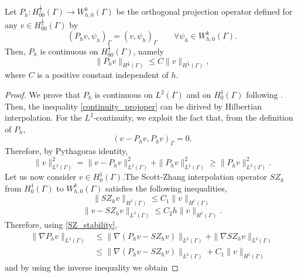 \begin{lemma}
Let $P_h: H^{\frac 12}_{00}(\Gamma) \longrightarrow W_{h,0}^k(\Gamma)$ be the orthogonal projection operator defined  for any $v \in H^{\frac 12}_{00}(\Gamma)$ by
\begin{equation*}
(P_h v , \psi_h)_\Gamma= (v, \psi_h)_\Gamma \qquad \forall \psi_h \in W_{h,0}^k(\Gamma).  
\end{equation*} 
Then, $P_h$ is continuous on $H^{\frac 12}_{00}(\Gamma)$, namely
\begin{equation}\label{continuity_projoper}
\|P_h v\|_{H^{\frac 12}(\Gamma)} \leq C \|v\|_{H^{\frac 12}(\Gamma)},
\end{equation}
where $C$ is a positive constant independent of $h$.
\end{lemma}
\begin{proof}
We prove that $P_h$ is continuous on $L^2(\Gamma)$ and on $H^1_0(\Gamma)$ following \cite[Section 1.6.3]{MR2050138}.  Then, the inequality \eqref{continuity_projoper} can be dirived by Hilbertian interpolation. For the $L^2$-continuity, we exploit the fact that, from the definition of $P_h$,
\begin{equation*}
(v-P_h v,P_h v)_{\Gamma}=0.
\end{equation*} 
Therefore, by Pythagoras identity,
\begin{equation*}
\|v\|^2_{L^2(\Gamma)} = \|v-P_h v\|_{L^2(\Gamma)}^2 + \|P_h v\|_{L^2(\Gamma)}^2 \geq \|P_h v\|^2 _{L^2(\Gamma)}.
\end{equation*}
Let us now consider $v\in H^1_0(\Gamma)$.The Scott-Zhang interpolation operator $SZ_h$ from $H^1_0(\Gamma)$ to $W_{h,0}^k(\Gamma)$ satisfies the following inequalities,
\begin{equation}\label{SZ_stability}
\|SZ_h v\|_{H^1(\Gamma)} \leq C_1 \|v\|_{H^1(\Gamma)}
\end{equation} 
\begin{equation}\label{SZ_approx}
\|v -SZ_h v \|_{L^2(\Gamma)}\leq C_2 h \|v\|_{H^1(\Gamma)}.
\end{equation}
Therefore, using \eqref{SZ_stability},
\begin{equation*}
\begin{split}
\|\nabla P_h v\|_{L^2(\Gamma)} 
&\leq \|\nabla (P_h v - SZ_h v)\|_{L^2(\Gamma)} + \|\nabla SZ_h v\|_{L^2(\Gamma)}\\
&\leq  \|\nabla (P_h v - SZ_h v)\|_{L^2(\Gamma)} + C_1\|v\|_{H^1(\Gamma)}
\end{split}
\end{equation*}
and by using the inverse inequality we obtain

\end{proof}
